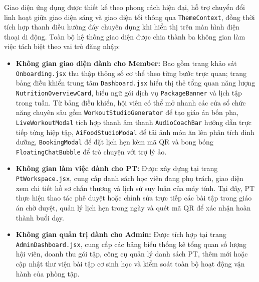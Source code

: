 Giao diện ứng dụng được thiết kế theo phong cách hiện đại, hỗ trợ chuyển đổi linh hoạt giữa giao diện sáng và giao diện tối thông qua \texttt{ThemeContext}, đồng thời tích hợp thanh điều hướng đáy chuyên dụng khi hiển thị trên màn hình điện thoại di động. Toàn bộ hệ thống giao diện được chia thành ba không gian làm việc tách biệt theo vai trò đăng nhập:
\begin{itemize}[leftmargin=1.5cm]
    \item \textbf{Không gian giao diện dành cho Member:} Bao gồm trang khảo sát \texttt{Onboarding.jsx} thu thập thông số cơ thể theo từng bước trực quan; trang bảng điều khiển trung tâm \texttt{Dashboard.jsx} hiển thị thẻ tổng quan năng lượng \texttt{NutritionOverviewCard}, biểu ngữ gói dịch vụ \texttt{PackageBanner} và lịch tập trong tuần. Từ bảng điều khiển, hội viên có thể mở nhanh các cửa sổ chức năng chuyên sâu gồm \texttt{WorkoutStudioGenerator} để tạo giáo án bốn pha, \texttt{LiveWorkoutModal} tích hợp thanh âm thanh \texttt{AudioCoachBar} hướng dẫn trực tiếp từng hiệp tập, \texttt{AiFoodStudioModal} để tải ảnh món ăn lên phân tích dinh dưỡng, \texttt{BookingModal} để đặt lịch hẹn kèm mã QR và bong bóng \texttt{FloatingChatBubble} để trò chuyện với trợ lý ảo.
    \item \textbf{Không gian làm việc dành cho PT:} Được xây dựng tại trang \texttt{PtWorkspace.jsx}, cung cấp danh sách học viên đang phụ trách, giao diện xem chi tiết hồ sơ chấn thương và lịch sử suy luận của máy tính. Tại đây, PT thực hiện thao tác phê duyệt hoặc chỉnh sửa trực tiếp các bài tập trong giáo án chờ duyệt, quản lý lịch hẹn trong ngày và quét mã QR để xác nhận hoàn thành buổi dạy.
    \item \textbf{Không gian quản trị dành cho Admin:} Được tích hợp tại trang \texttt{AdminDashboard.jsx}, cung cấp các bảng biểu thống kê tổng quan số lượng hội viên, doanh thu gói tập, công cụ quản lý danh sách PT, thêm mới hoặc cập nhật thư viện bài tập cơ sinh học và kiểm soát toàn bộ hoạt động vận hành của phòng tập.
\end{itemize}
